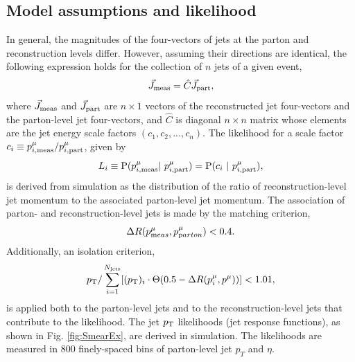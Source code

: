 \subsection{Model assumptions and likelihood} 
In general, the magnitudes of the four-vectors of jets at the parton and reconstruction levels differ. However, assuming their directions are identical, the following expression holds for the collection of $n$ jets of a given event,
\begin{equation}
\vec{J}_{\rm meas} = \hat{C} \vec{J}_{\rm part},
\end{equation}
where $\vec{J}_{\rm meas}$ and $\vec{J}_{\rm part}$ are $n\times 1$ vectors of the reconstructed jet four-vectors and the parton-level jet four-vectors, and $\hat{C}$ is diagonal $n\times n$ matrix whose elements are the jet energy scale factors $(c_1,c_2,...,c_n)$. The likelihood for a scale factor $c_i\equiv p^{\mu}_{i,\rm meas}/p^{\mu}_{i,\rm part}$, given by
\begin{equation}
L_{i}\equiv{\rm P}(p^{\mu}_{i,\rm meas}|\ p^{\mu}_{i,\rm part})={\rm P}(c_i\ |\ p^{\mu}_{i,\rm part}),
\label{eq:JetEnergyLikelihood}
\end{equation}
is derived from simulation as the distribution of the ratio of reconstruction-level jet momentum to the associated parton-level jet momentum. The association of parton- and reconstruction-level jets is made by the matching criterion,
\begin{equation}
\Delta R(p^{\mu}_{\textrm meas},p^{\mu}_{\textrm parton})<0.4.
\end{equation}	
Additionally, an isolation criterion,
\begin{equation}
p_{\rm T}/\sum_{i=1}^{N_{\rm jets}}[(p_{\rm T})_{i}\cdot\Theta(0.5-\Delta R(p^{\mu}_{i},p^{\mu}))]<1.01,
\end{equation}
is applied both to the parton-level jets and to the reconstruction-level jets that contribute to the likelihood. The jet $p_{\text{T}}$ likelihoods (jet response functions), as shown in Fig. \ref{fig:SmearEx}, are derived in simulation. The likelihoods are measured in 800 finely-spaced bins of parton-level jet $p_T$ and $\eta$.

